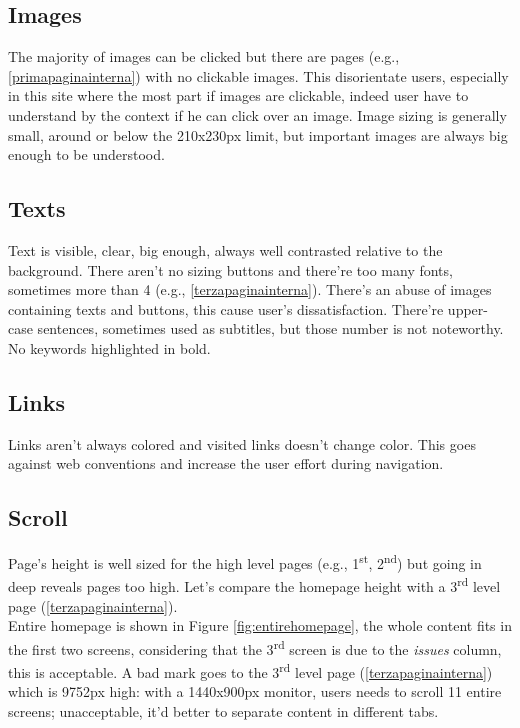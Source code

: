 \documentclass[
10pt, %
a4paper, %
oneside, %
headinclude,footinclude, %
BCOR5mm, %
]{scrartcl}
\begin{document}
	\subsection{Images}
	The majority of images can be clicked but there are pages (e.g., \ref{primapaginainterna}) with no clickable images. This disorientate users, especially in this site where the most part if images are clickable, indeed user have to understand by the context if he can click over an image.
	Image sizing is generally small, around or below the 210x230px limit, but important images are always big enough to be understood.

	\subsection{Texts}
	Text is visible, clear, big enough, always well contrasted relative to the background. There aren't no sizing buttons and there're too many fonts, sometimes more than 4 (e.g., \ref{terzapaginainterna}).
	There's an abuse of images containing texts and buttons, this cause user's dissatisfaction. 
	There're upper-case sentences, sometimes used as subtitles, but those number is not noteworthy. No keywords highlighted in bold.

	\subsection{Links}
	Links aren't always colored and visited links doesn't change color. This goes against web conventions and increase the user effort during navigation. 

	\subsection{Scroll}
	Page's height is well sized for the high level pages (e.g., 1\textsuperscript{st}, 2\textsuperscript{nd}) but going in deep reveals pages too high. Let's compare the homepage height with a 3\textsuperscript{rd} level page (\ref{terzapaginainterna}). \\
	Entire homepage is shown in Figure \ref{fig:entirehomepage}, the whole content fits in the first two screens, considering that the 3\textsuperscript{rd} screen is due to the \emph{issues} column, this is acceptable.
	A bad mark goes to the 3\textsuperscript{rd} level page (\ref{terzapaginainterna}) which is 9752px high: with a 1440x900px monitor, users needs to scroll 11 entire screens; unacceptable, it'd better to separate content in different tabs. 
\end{document}
